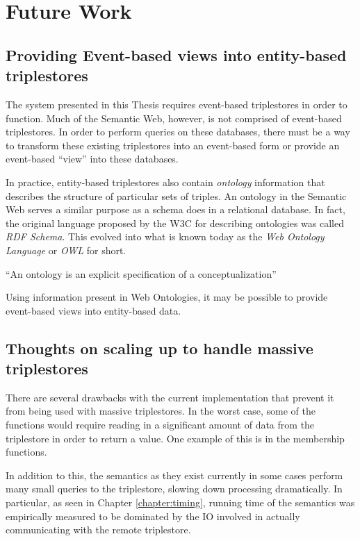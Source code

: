 \documentclass[../main.tex]{subfiles}
\begin{document}
	
\chapter{Future Work}
\label{chapter:futurework}

\section{Providing Event-based views into entity-based triplestores}

The system presented in this Thesis requires event-based triplestores in order to function.  Much of the Semantic Web, however, is not comprised of event-based triplestores.  In order to perform queries on these databases, there must be a way to transform these existing triplestores into an event-based form or provide an event-based ``view'' into these databases. 

In practice, entity-based triplestores also contain {\em ontology} information that describes the structure of particular sets of triples.  An ontology in the Semantic Web
serves a similar purpose as a schema does in a relational database.  In fact, the original language proposed by the W3C for describing ontologies was called {\em RDF Schema}.  This evolved into what is known today as the {\em Web Ontology Language} or {\em OWL} for short.

\begin{definition}[Ontology]
	``An ontology is an explicit specification of a conceptualization''\cite{gruber}
\end{definition}

Using information present in Web Ontologies, it may be possible to provide event-based views into entity-based data.

\section{Thoughts on scaling up to handle massive triplestores}

There are several drawbacks with the current implementation that prevent it from being used with massive triplestores.
In the worst case, some of the functions would require reading in a significant amount of data from the triplestore in order to return a value.  One example of this is in the membership functions.

In addition to this, the semantics as they exist currently in some cases perform many small queries to the triplestore, slowing down processing dramatically.
In particular, as seen in Chapter \ref{chapter:timing}, running time of the semantics was empirically measured to be dominated by the IO involved in actually communicating
with the remote triplestore.
\end{document}
